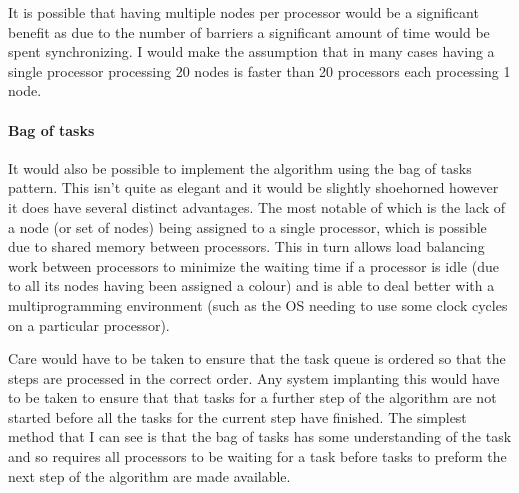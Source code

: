\documentclass[11pt,a4paper]{article}
\begin{document}
It is possible that having multiple nodes per processor would be a significant benefit as
due to the number of barriers a significant amount of time would be spent synchronizing.
I would make the assumption that in many cases having a single processor processing 20 nodes is
faster than 20 processors each processing 1 node.

%

\paragraph{Bag of tasks} It would also be possible to implement the algorithm using the bag of tasks
pattern. This isn't quite as elegant and it would be slightly shoehorned
however it does have several distinct advantages. The most notable of which is
the lack of a node (or set of nodes) being assigned to a single processor,
which is possible due to shared memory between processors. This in turn allows
load balancing work between processors to minimize the waiting time if a
processor is idle (due to all its nodes having been assigned a colour) and is able
to deal better with a multiprogramming environment (such as the OS needing to use some clock cycles on a particular processor).

Care would have to be taken to ensure that the task queue is ordered so
that the steps are processed in the correct order. Any system implanting
this would have to be taken to ensure that that tasks for a further step of the algorithm are not
started before all the tasks for the current step have finished.  The simplest method that I can see is that the bag of tasks has some understanding of the task and so requires all processors to be waiting for a task before tasks to preform the next step of the algorithm are made available.
\end{document}
